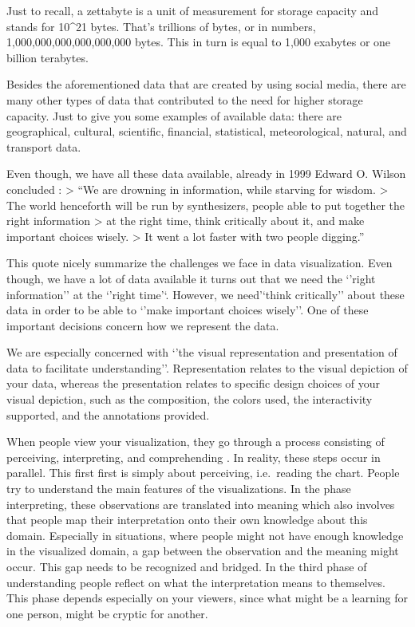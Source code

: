 \documentclass[
]{book}
\begin{document}
Just to recall, a zettabyte is a unit of measurement for storage capacity and stands for 10\^{}21 bytes. That's trillions of bytes, or in numbers, 1,000,000,000,000,000,000 bytes. This in turn is equal to 1,000 exabytes or one billion terabytes.

Besides the aforementioned data that are created by using social media, there are many other types of data that contributed to the need for higher storage capacity. Just to give you some examples of available data: there are geographical, cultural, scientific, financial, statistical, meteorological, natural, and transport data.

Even though, we have all these data available, already in 1999 Edward O. Wilson concluded \citep{wilson1999consilience}:
\textgreater{} ``We are drowning in information, while starving for wisdom.
\textgreater{} The world henceforth will be run by synthesizers, people able to put together the right information
\textgreater{} at the right time, think critically about it, and make important choices wisely.
\textgreater{} It went a lot faster with two people digging.''

This quote nicely summarize the challenges we face in data visualization. Even though, we have a lot of data available it turns out that we need the `'right information'' at the `'right time'`. However, we need'`think critically'' about these data in order to be able to `'make important choices wisely''. One of these important decisions concern how we represent the data.

We are especially concerned with `'the visual representation and presentation of data to facilitate understanding''\citep{kirk2019data}. Representation relates to the visual depiction of your data, whereas the presentation relates to specific design choices of your visual depiction, such as the composition, the colors used, the interactivity supported, and the annotations provided.

When people view your visualization, they go through a process consisting of perceiving, interpreting, and comprehending \citep{kirk2019data}. In reality, these steps occur in parallel. This first first is simply about perceiving, i.e.~reading the chart. People try to understand the main features of the visualizations. In the phase interpreting, these observations are translated into meaning which also involves that people map their interpretation onto their own knowledge about this domain. Especially in situations, where people might not have enough knowledge in the visualized domain, a gap between the observation and the meaning might occur. This gap needs to be recognized and bridged. In the third phase of understanding people reflect on what the interpretation means to themselves. This phase depends especially on your viewers, since what might be a learning for one person, might be cryptic for another.
\end{document}
